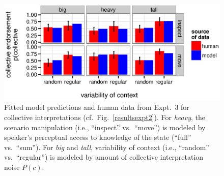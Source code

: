 \documentclass[preprint,12pt,authoryear,titlepage]{elsarticle}
\newcommand{\ndg}[1]{\textcolor{Green}{[ndg: #1]}}
\newcommand{\gcs}[1]{\textcolor{blue}{[gcs: #1]}}
\begin{document}


\begin{figure}[h]
	\centering
	\includegraphics[width=\linewidth]{plots/model_all_new.eps}
	\vspace{-20pt}
	\caption{Fitted model predictions and human data from Expt.~3 for collective interpretations (cf.~Fig.~\ref{resultsexpt2}). For \emph{heavy}, the scenario manipulation (i.e., ``inspect'' vs.~``move'') is modeled by speaker's perceptual access to knowledge of the state (``full'' vs.~``sum''). For \emph{big} and \emph{tall}, variability of context (i.e., ``random'' vs.~``regular'') is modeled by amount of collective interpretation noise $P(c)$.} \label{fit-model}
\end{figure}
\end{document}

